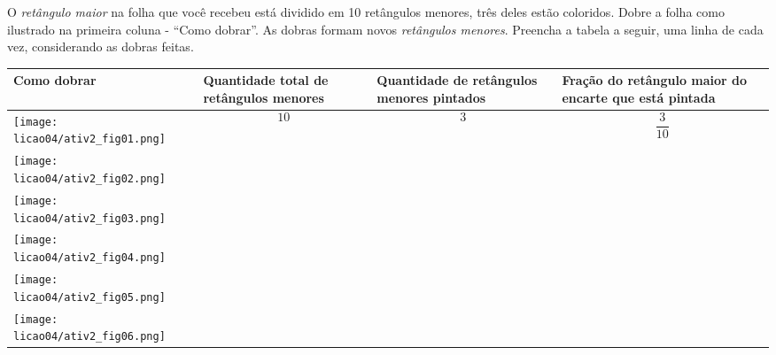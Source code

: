\begin{atividade}
\label{chap4-ativ2}


O \textit{retângulo maior} na folha que você recebeu está dividido em 10 retângulos menores, três deles estão coloridos. Dobre a folha como ilustrado na primeira coluna - ``Como dobrar''. As dobras formam novos \textit{retângulos menores}. Preencha a tabela a seguir, uma linha de cada vez, considerando as dobras feitas.
\clearpage


 \begin{tabular}{|e{110pt}|e{.16\textwidth}|e{.20\textwidth}|e{.28\textwidth}|}
    \hline
      Como dobrar  &  Quantidade total de retângulos menores & Quantidade de retângulos menores pintados  &   Fração do retângulo maior do encarte que está pintada  \\
    \hline \hline
    \texttt{[image: licao04/ativ2\_fig01.png]}      & $$10$$ & $$3$$&  $$\dfrac{3}{10}$$   \\
    \hline
     \texttt{[image: licao04/ativ2\_fig02.png]}                                                                              & &  &  \\
    \hline
     \texttt{[image: licao04/ativ2\_fig03.png]}     &  &   &  \\
    \hline
     \texttt{[image: licao04/ativ2\_fig04.png]} & &&\\
    \hline
     \texttt{[image: licao04/ativ2\_fig05.png]}  &                                     &                                  &                                                   \\
    \hline
     \texttt{[image: licao04/ativ2\_fig06.png]} &                                     &                                  &                                                   \\
    \hline
  \end{tabular}

\end{atividade}
\clearpage

